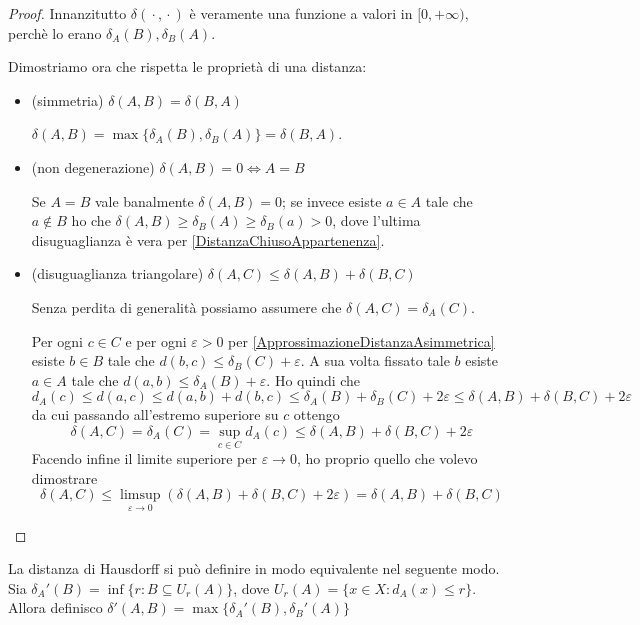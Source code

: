 \begin{proof}
	Innanzitutto $\delta({}\cdot{},{}\cdot{})$ è veramente una funzione a valori in $[0,+\infty)$, perchè lo erano $\delta_A(B),\delta_B(A)$.

	Dimostriamo ora che rispetta le proprietà di una distanza:
	\begin{itemize}
		\item (simmetria) $\delta(A,B)=\delta(B,A)$
		
		$\delta(A,B)=\max\{ \delta_A(B),\delta_B(A) \}=\delta(B,A)$.
		\item (non degenerazione) $\delta(A,B)=0 \iff A=B$
		
		Se $A=B$ vale banalmente $\delta(A,B)=0$; se invece esiste $a\in A$ tale che $a\not\in B$ ho che $\delta(A,B)\ge \delta_B(A)\ge \delta_B(a)>0$, dove l'ultima disuguaglianza è vera per \cref{DistanzaChiusoAppartenenza}.
		\item (disuguaglianza triangolare) $\delta(A,C)\le \delta(A,B)+\delta(B,C)$

		Senza perdita di generalità possiamo assumere che $\delta(A,C)=\delta_A(C)$. 

		Per ogni $c\in C$ e per ogni $\varepsilon>0$ per \cref{ApprossimazioneDistanzaAsimmetrica} esiste $b\in B$ tale che $d(b,c)\le \delta_B(C)+\varepsilon$. A sua volta fissato tale $b$ esiste $a\in A$ tale che $d(a,b)\le \delta_A(B)+\varepsilon$. Ho quindi che
		\begin{equation*}
			d_A(c)\le d(a,c)\le d(a,b)+d(b,c)\le \delta_A(B)+\delta_B(C)+2\varepsilon\le \delta(A,B)+\delta(B,C)+2\varepsilon
		\end{equation*}
		da cui passando all'estremo superiore su $c$ ottengo
		\begin{equation*}
			\delta(A,C)=\delta_A(C)=\sup_{c\in C}d_A(c)\le \delta(A,B)+\delta(B,C)+2\varepsilon
		\end{equation*}
		Facendo infine il limite superiore per $\varepsilon\to 0$, ho proprio quello che volevo dimostrare
		\begin{equation*}
			\delta(A,C)\le \limsup_{\varepsilon\to 0}(\delta(A,B)+\delta(B,C)+2\varepsilon)=\delta(A,B)+\delta(B,C)
		\end{equation*}
	\end{itemize}
\end{proof}

\begin{definition} \label{HausdorffDefinizioneEquivalente}
	La distanza di Hausdorff si può definire in modo equivalente nel seguente modo. Sia $\delta_A'(B)=\inf\{r:B\subseteq U_r(A)\}$, dove $U_r(A)=\{x\in X : d_A(x)\le r \}$. Allora definisco $\delta'(A,B)=\max\{\delta_A'(B),\delta_B'(A)\}$
\end{definition}

